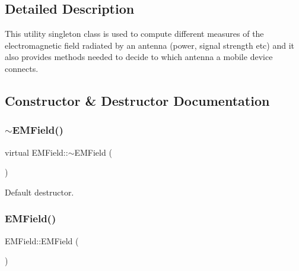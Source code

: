 \subsection{Detailed Description}
This utility singleton class is used to compute different measures of the electromagnetic field radiated by an antenna (power, signal strength etc) and it also provides methods needed to decide to which antenna a mobile device connects. 

\subsection{Constructor \& Destructor Documentation}
\mbox{\label{class_e_m_field_abe7db07a27a120858107d5efa5f14edb}} 
\subsubsection{\texorpdfstring{$\sim$\+E\+M\+Field()}{~EMField()}}
{\footnotesize\ttfamily virtual E\+M\+Field\+::$\sim$\+E\+M\+Field (\begin{DoxyParamCaption}{ }\end{DoxyParamCaption})\hspace{0.3cm}{\ttfamily [virtual]}}

Default destructor. \mbox{\label{class_e_m_field_a054f389cfa853008f32c02d874aa4d58}} 
\subsubsection{\texorpdfstring{E\+M\+Field()}{EMField()}\hspace{0.1cm}{\footnotesize\ttfamily [1/2]}}
{\footnotesize\ttfamily E\+M\+Field\+::\+E\+M\+Field (\begin{DoxyParamCaption}{ }\end{DoxyParamCaption})\hspace{0.3cm}{\ttfamily [private]}}

\mbox{\label{class_e_m_field_a7760631ded36ba2c5a918c97a1cc93e9}} 
